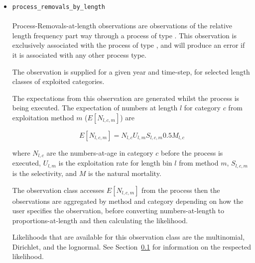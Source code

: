 \else
\begin{itemize}
	\item \texttt{process\_removals\_by\_length}
	
	\paragraph*{\label{sec:removals-by-length}}\label{sec:Observation-ProcessRemovalsByLength}
	
	Process-Removals-at-length observations are observations of the relative length frequency part way through a process of type . This observation is exclusively associated with the process of type , and will produce an error if it is associated with any other process type.
	
	The observation is supplied for a given year and time-step, for selected length classes of exploited categories.

	The expectations from this observation are generated whilst the process is being executed. The expectation of numbers at length $l$ for category $c$ from exploitation method $m$ ($E[N_{l,c,m}]$) are
	
	\begin{equation}
	E[N_{l,c,m}] = N_{l,c} U_{l,m} S_{l,c,m} 0.5 M_{l,c}
	\end{equation}
	
	where $N_{l,c}$ are the numbers-at-age in category $c$ before the process is executed, $U_{l,m}$ is the exploitation rate for length bin $l$ from method $m$, $S_{l,c,m}$ is the selectivity, and $M$ is the natural mortality.
	
	The observation class accesses $E[N_{l,c,m}]$ from the process then the observations are aggregated by method and category depending on how the user specifies the observation, before converting numbers-at-length to proportions-at-length and then calculating the likelihood.
	
	Likelihoods that are available for this observation class are the multinomial, Dirichlet, and the lognormal. See Section~\ref{sec:Likelihood} for information on the respected likelihood.
\end{itemize}
\fi %

\subsection{}\label{sec:Likelihood}

